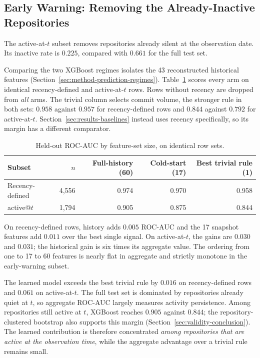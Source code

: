 \subsection{Early Warning: Removing the Already-Inactive Repositories}
\label{sec:results-history-ablation}

The active-at-\(t\) subset removes repositories already silent at the
observation date. Its inactive rate is \(0.225\), compared with \(0.661\) for
the full test set.

Comparing the two XGBoost regimes isolates the 43 reconstructed historical
features (Section~\ref{sec:method-prediction-regimes}).
Table~\ref{tab:history-ablation} scores every arm on identical recency-defined
and active-at-\(t\) rows. Rows without recency are dropped from \emph{all} arms. The
trivial column selects commit volume, the stronger rule in both sets:
\(0.958\) against \(0.957\) for recency-defined rows and \(0.844\) against
\(0.792\) for active-at-\(t\). Section~\ref{sec:results-baselines} instead uses
recency specifically, so its margin has a different comparator.

\begin{table}[htbp]
  \centering
  \caption{Held-out ROC-AUC by feature-set size, on identical row sets.}
  \label{tab:history-ablation}
  \begin{tabular}{lrrrr}
    \toprule
    Subset & \(n\) & Full-history (60) & Cold-start (17) & Best trivial rule (1) \\
    \midrule
    Recency-defined & 4{,}556 & 0.974 & 0.970 & 0.958 \\
    active@\(t\)    & 1{,}794 & 0.905 & 0.875 & 0.844 \\
    \bottomrule
  \end{tabular}
\end{table}

On recency-defined rows, history adds \(0.005\) ROC-AUC and the 17 snapshot
features add \(0.011\) over the best single signal. On active-at-\(t\), the gains
are \(0.030\) and \(0.031\); the historical gain is six times its aggregate
value. The ordering from one to 17 to 60 features is nearly flat in aggregate and
strictly monotone in the early-warning subset.

The learned model exceeds the best trivial rule by \(0.016\) on recency-defined
rows and \(0.061\) on active-at-\(t\). The full test set is dominated by
repositories already quiet at \(t\), so aggregate ROC-AUC largely measures
activity persistence. Among repositories still active at \(t\), XGBoost reaches
\(0.905\) against \(0.844\); the repository-clustered bootstrap also supports
this margin (Section~\ref{sec:validity-conclusion}). The learned contribution is
therefore concentrated
\emph{among repositories that are active at the observation time}, while the
aggregate advantage over a trivial rule remains
small.

